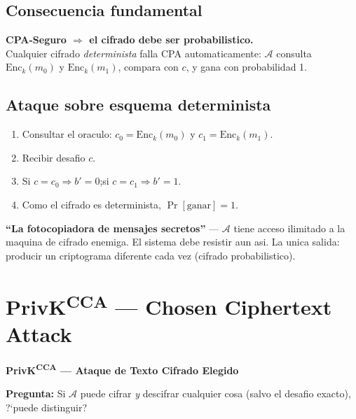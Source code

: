 \documentclass[a4paper,11pt]{article}
\begin{document}
\subsection{Consecuencia fundamental}

\begin{insightbox}
\textbf{CPA-Seguro $\Rightarrow$ el cifrado debe ser probabilistico.}\\[4pt]
Cualquier cifrado \emph{determinista} falla CPA automaticamente: $\mathcal{A}$ consulta $\mathrm{Enc}_k(m_0)$ y $\mathrm{Enc}_k(m_1)$, compara con $c$, y gana con probabilidad 1.
\end{insightbox}

\subsection{Ataque sobre esquema determinista}

\begin{attackbox}
\begin{enumerate}[leftmargin=*, label=\textbf{\arabic*.}]
  \item Consultar el oraculo: $c_0 = \mathrm{Enc}_k(m_0)$ y $c_1 = \mathrm{Enc}_k(m_1)$.
  \item Recibir desafio $c$.
  \item Si $c = c_0 \Rightarrow b'=0$;\quad si $c = c_1 \Rightarrow b'=1$.
  \item Como el cifrado es determinista, $\Pr[\text{ganar}] = 1$.
\end{enumerate}
\end{attackbox}

\begin{hookbox}
\textbf{``La fotocopiadora de mensajes secretos''} --- $\mathcal{A}$ tiene acceso ilimitado a la maquina de cifrado enemiga. El sistema debe resistir aun asi. La unica salida: producir un criptograma diferente cada vez (cifrado probabilistico).
\end{hookbox}

\section{PrivK\textsuperscript{CCA} --- Chosen Ciphertext Attack}

\begin{tcolorbox}[
  enhanced, breakable,
  colback=white, colframe=itbaRed,
  borderline west={3pt}{0pt}{itbaRed},
  sharp corners, drop shadow,
  top=4mm, left=4mm, right=4mm, bottom=4mm,
]
{\color{itbaRed}\large\bfseries PrivK\textsuperscript{CCA} --- Ataque de Texto Cifrado Elegido}\par\vspace{4pt}
\textbf{Pregunta:} Si $\mathcal{A}$ puede cifrar \emph{y} descifrar cualquier cosa (salvo el desafio exacto), ?`puede distinguir?
\end{tcolorbox}
\end{document}
